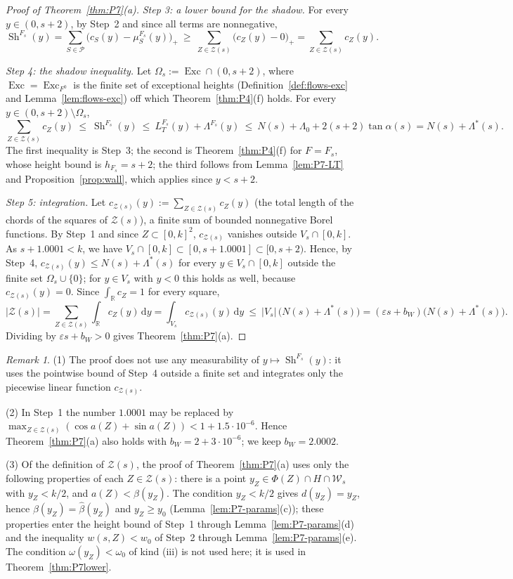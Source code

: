 \documentclass[11pt]{amsart}
\newcommand{\R}{\mathbb R}
\newcommand{\eps}{\varepsilon}
\newcommand{\cP}{\mathcal P}
\newcommand{\cZ}{\mathcal Z}
\newcommand{\Sh}{\operatorname{Sh}}
\newcommand{\Exc}{\operatorname{Exc}}
\newcommand{\Fz}{F^{0}}
\newcommand{\Fs}{F_{s}}
\newcommand{\dd}{\,\mathrm d}
\theoremstyle{definition}
\theoremstyle{remark}
\newtheorem{remark}[theorem]{Remark}
\numberwithin{equation}{section}
\begin{document}
\begin{proof}[Proof of Theorem~\ref{thm:P7}(a)]
\emph{Step 3: a lower bound for the shadow.} For every $y\in(0,s+2)$, by Step~2 and since all terms are nonnegative,
\[
\Sh^{\Fs}(y)=\sum_{S\in\cP}\big(c_S(y)-\mu^{\Fs}_S(y)\big)_+\ \ge\ \sum_{Z\in\cZ(s)}\big(c_Z(y)-0\big)_+=\sum_{Z\in\cZ(s)}c_Z(y).
\]

\emph{Step 4: the shadow inequality.} Let $\Omega_s:=\Exc\cap(0,s+2)$, where $\Exc=\Exc_{\Fz}$ is the finite set of exceptional heights (Definition~\ref{def:flows-exc} and Lemma~\ref{lem:flows-exc}) off which Theorem~\ref{thm:P4}(f) holds. For every $y\in(0,s+2)\setminus\Omega_s$,
\[
\sum_{Z\in\cZ(s)}c_Z(y)\ \le\ \Sh^{\Fs}(y)\ \le\ L^{\Fs}_T(y)+\Lambda^{\Fs}(y)\ \le\ N(s)+\Lambda_0+2(s+2)\tan\alpha(s)=N(s)+\Lambda^*(s).
\]
The first inequality is Step~3; the second is Theorem~\ref{thm:P4}(f) for $F=\Fs$, whose height bound is $h_{\Fs}=s+2$; the third follows from Lemma~\ref{lem:P7-LT} and Proposition~\ref{prop:wall}, which applies since $y<s+2$.

\emph{Step 5: integration.} Let $c_{\cZ(s)}(y):=\sum_{Z\in\cZ(s)}c_Z(y)$ (the total length of the chords of the squares of $\cZ(s)$), a finite sum of bounded nonnegative Borel functions. By Step~1 and since $Z\subset[0,k]^2$, $c_{\cZ(s)}$ vanishes outside $V_s\cap[0,k]$. As $s+1.0001<k$, we have $V_s\cap[0,k]\subset[0,s+1.0001]\subset[0,s+2)$. Hence, by Step~4, $c_{\cZ(s)}(y)\le N(s)+\Lambda^*(s)$ for every $y\in V_s\cap[0,k]$ outside the finite set $\Omega_s\cup\{0\}$; for $y\in V_s$ with $y<0$ this holds as well, because $c_{\cZ(s)}(y)=0$. Since $\int_\R c_Z=1$ for every square,
\[
|\cZ(s)|=\sum_{Z\in\cZ(s)}\int_\R c_Z(y)\dd y=\int_{V_s}c_{\cZ(s)}(y)\dd y\ \le\ |V_s|\,\big(N(s)+\Lambda^*(s)\big)=(\eps s+b_W)\big(N(s)+\Lambda^*(s)\big).
\]
Dividing by $\eps s+b_W>0$ gives Theorem~\ref{thm:P7}(a).
\end{proof}

\begin{remark}\label{rem:P7-proof}
(1) The proof does not use any measurability of $y\mapsto\Sh^{\Fs}(y)$: it uses the pointwise bound of Step~4 outside a finite set and integrates only the piecewise linear function $c_{\cZ(s)}$.

(2) In Step~1 the number $1.0001$ may be replaced by $\max_{Z\in\cZ(s)}(\cos a(Z)+\sin a(Z))<1+1.5\cdot10^{-6}$. Hence Theorem~\ref{thm:P7}(a) also holds with $b_W=2+3\cdot10^{-6}$; we keep $b_W=2.0002$.

(3) Of the definition of $\cZ(s)$, the proof of Theorem~\ref{thm:P7}(a) uses only the following properties of each $Z\in\cZ(s)$: there is a point $y_Z\in\Phi(Z)\cap H\cap\mathcal W_s$ with $y_Z<k/2$, and $a(Z)<\beta(y_Z)$. The condition $y_Z<k/2$ gives $d(y_Z)=y_Z$, hence $\beta(y_Z)=\hat\beta(y_Z)$ and $y_Z\ge y_0$ (Lemma~\ref{lem:P7-params}(c)); these properties enter the height bound of Step~1 through Lemma~\ref{lem:P7-params}(d) and the inequality $w(s,Z)<w_0$ of Step~2 through Lemma~\ref{lem:P7-params}(e). The condition $\omega(y_Z)<\omega_0$ of kind (iii) is not used here; it is used in Theorem~\ref{thm:P7lower}.
\end{remark}
\end{document}
